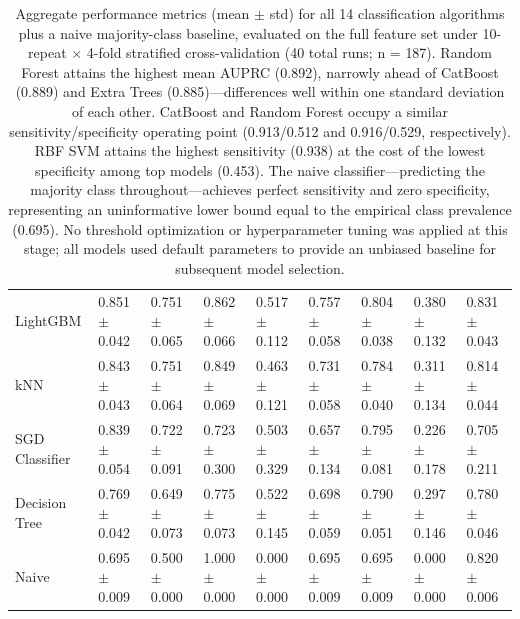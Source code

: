 \documentclass[pdflatex,sn-mathphys-num]{sn-jnl}%
\theoremstyle{thmstyleone}%
\theoremstyle{thmstyletwo}%
\theoremstyle{thmstylethree}%
\begin{document}
\begin{appendices}
\begin{table}
\begin{tabular}{lllllllll}
        LightGBM & 0.851 $\pm$ 0.042 & 0.751 $\pm$ 0.065 & 0.862 $\pm$ 0.066 & 0.517 $\pm$ 0.112 & 0.757 $\pm$ 0.058 & 0.804 $\pm$ 0.038 & 0.380 $\pm$ 0.132 & 0.831 $\pm$ 0.043 \\
        kNN & 0.843 $\pm$ 0.043 & 0.751 $\pm$ 0.064 & 0.849 $\pm$ 0.069 & 0.463 $\pm$ 0.121 & 0.731 $\pm$ 0.058 & 0.784 $\pm$ 0.040 & 0.311 $\pm$ 0.134 & 0.814 $\pm$ 0.044 \\
        SGD Classifier & 0.839 $\pm$ 0.054 & 0.722 $\pm$ 0.091 & 0.723 $\pm$ 0.300 & 0.503 $\pm$ 0.329 & 0.657 $\pm$ 0.134 & 0.795 $\pm$ 0.081 & 0.226 $\pm$ 0.178 & 0.705 $\pm$ 0.211 \\
        Decision Tree & 0.769 $\pm$ 0.042 & 0.649 $\pm$ 0.073 & 0.775 $\pm$ 0.073 & 0.522 $\pm$ 0.145 & 0.698 $\pm$ 0.059 & 0.790 $\pm$ 0.051 & 0.297 $\pm$ 0.146 & 0.780 $\pm$ 0.046 \\
        Naive & 0.695 $\pm$ 0.009 & 0.500 $\pm$ 0.000 & 1.000 $\pm$ 0.000 & 0.000 $\pm$ 0.000 & 0.695 $\pm$ 0.009 & 0.695 $\pm$ 0.009 & 0.000 $\pm$ 0.000 & 0.820 $\pm$ 0.006 \\
        \bottomrule
    \end{tabular}
    \caption{Aggregate performance metrics (mean $\pm$ std) for all 14 classification algorithms plus a naive majority-class baseline, evaluated on the full feature set under 10-repeat × 4-fold stratified cross-validation (40 total runs; n = 187). Random Forest attains the highest mean AUPRC (0.892), narrowly ahead of CatBoost (0.889) and Extra Trees (0.885)---differences well within one standard deviation of each other. CatBoost and Random Forest occupy a similar sensitivity/specificity operating point (0.913/0.512 and 0.916/0.529, respectively). RBF SVM attains the highest sensitivity (0.938) at the cost of the lowest specificity among top models (0.453). The naive classifier---predicting the majority class throughout---achieves perfect sensitivity and zero specificity, representing an uninformative lower bound equal to the empirical class prevalence (0.695). No threshold optimization or hyperparameter tuning was applied at this stage; all models used default parameters to provide an unbiased baseline for subsequent model selection.}
    \label{tab:selection_metrics}
\end{table}


\end{appendices}
\end{document}
